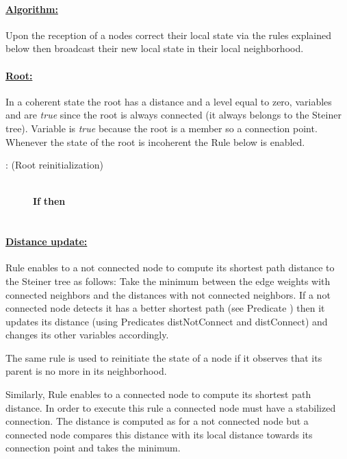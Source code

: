 \documentclass[11pt]{article}
\newcommand{\distConnect}{\mbox{\sf distConnect}}
\newcommand{\distNotConnect}{\mbox{\sf distNotConnect}}
\newcommand{\ARA}{}
\newcommand{\ARB}{}
\newcommand{\CRA}{}
\begin{document}
\paragraph{\underline{Algorithm:}}
Upon the reception  of a  nodes correct their local state
via the rules explained below then broadcast their new local state in 
their local neighborhood.







\paragraph{\underline{Root:}}

In a coherent state the root has a distance and a level equal to zero,
variables  and  
are \emph{true} since the root is always connected (it always belongs to the Steiner tree). Variable  is \emph{true} because the root is a member so a connection point.
Whenever the state of the root is incoherent the Rule \CRA\/ below is enabled.
\begin{small}
\begin{description}
\item[\CRA: (Root reinitialization)]~\\\textbf{If}  \textbf{then}\\
\hspace*{0,8cm}   \\ 
\hspace*{0,8cm} 
\end{description}
\end{small}


\paragraph{\underline{Distance update:}} 

Rule \ARA\/ enables to a not connected node to compute its shortest path
distance to the Steiner tree 
as follows: Take the minimum between the edge weights with connected
neighbors and the distances 
with not connected neighbors. If a not connected node detects it has a
better 
shortest path (see Predicate ) then it updates its distance 
(using Predicates \distNotConnect\/ and \distConnect) and changes its
other variables accordingly. 

The same rule is used to reinitiate the state of a node if it observes that its parent is no more in its neighborhood.

Similarly, Rule \ARB\/ enables to a connected node to compute its
shortest path distance. In order to execute this rule 
a connected node must have a stabilized connection. The distance is
computed as for a not connected node but a connected node compares
this distance with its local distance towards its connection point and takes the minimum.
\end{document}
